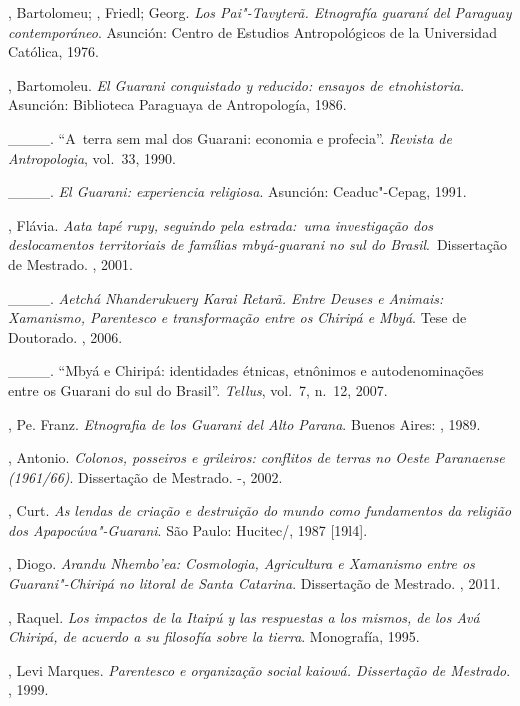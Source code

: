 \begin{Parskip}
, Bartolomeu; , Friedl;  Georg. \emph{Los Pai"-Tavyterã.
Etnografía guaraní del Paraguay contemporáneo}. Asunción: Centro de
Estudios Antropológicos de la Universidad Católica, 1976.

, Bartomoleu. \emph{El Guarani conquistado y reducido: ensayos de
etnohistoria}. Asunción: Biblioteca Paraguaya de Antropología, 1986.

\_\_\_\_. ``A~terra sem mal dos Guarani: economia e profecia''. \emph{Revista de
Antropologia}, vol.~33, 1990. 

\_\_\_\_. \emph{El Guarani: experiencia religiosa}. Asunción: Ceaduc"-Cepag, 1991.

, Flávia. \emph{Aata tapé rupy, seguindo pela estrada:~uma
investigação dos deslocamentos territoriais de famílias mbyá-guarani no
sul do Brasil}.~Dissertação de Mestrado. , 2001.

\_\_\_\_. \emph{Aetchá Nhanderukuery Karai Retarã. Entre Deuses e Animais:
Xamanismo, Parentesco e transformação entre os Chiripá e Mbyá}. Tese de
Doutorado. , 2006. 

\_\_\_\_. ``Mbyá e Chiripá: identidades étnicas, etnônimos e autodenominações
entre os Guarani do sul do Brasil''. \emph{Tellus}, vol.~7, n.~12, 2007.

, Pe. Franz. \emph{Etnografia de los Guarani del Alto Parana}. Buenos
Aires: , 1989.

, Antonio. \emph{Colonos, posseiros e grileiros: conflitos de
terras no Oeste Paranaense (1961/66)}. Dissertação de Mestrado.
-, 2002.

, Curt. \emph{As lendas de criação e destruição do mundo como
fundamentos da religião dos Apapocúva"-Guarani}. São Paulo: Hucitec/,
1987 [19l4].

, Diogo. \emph{Arandu Nhembo’ea: Cosmologia, Agricultura e Xamanismo
entre os Guarani"-Chiripá no litoral de Santa Catarina}. Dissertação de
Mestrado. , 2011.

, Raquel. \emph{Los impactos de la Itaipú y las respuestas a los
mismos, de los Avá Chiripá, de acuerdo a su filosofía sobre la tierra}.
Monografía, 1995.

, Levi Marques. \emph{Parentesco e organização social kaiowá.
Dissertação de Mestrado}. , 1999.


\end{Parskip}
